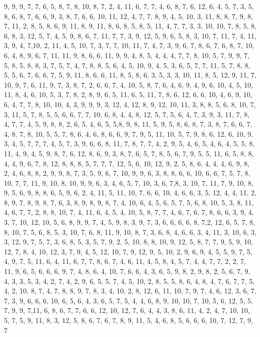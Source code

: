 \documentclass[fleqn,a4paper,12pt]{article}
\begin{document}
  9, 9, 9, 7, 7, 6, 5, 8, 7, 8, 10, 8, 7, 2, 4, 11, 6, 7, 7, 4, 6, 8, 7, 6, 12, 6, 4, 5, 7, 3, 5, 8, 6, 8, 7, 6, 6, 9, 3, 8, 7, 6, 6, 10, 11, 12, 4, 7, 7, 8, 9, 4, 5, 10, 3, 11, 8, 8, 7, 9, 8, 7, 11, 2, 8, 5, 8, 6, 9, 11, 8, 9, 11, 8, 6, 8, 5, 8, 5, 11, 4, 7, 7, 3, 3, 10, 10, 7, 8, 5, 8, 6, 8, 3, 12, 5, 7, 4, 5, 9, 8, 6, 7, 11, 7, 7, 3, 9, 12, 5, 9, 6, 5, 8, 3, 10, 7, 11, 7, 4, 11, 3, 9, 4, 7,10, 2, 11, 4, 5, 10, 7, 3, 7, 7, 10, 11, 7, 4, 7, 3, 9, 6, 7, 8, 6, 7, 6, 8, 7, 10, 6, 4, 8, 9, 6, 7, 11, 11, 9, 8, 6, 6, 11, 9, 9, 4, 8, 5, 4, 4, 4, 7, 7, 8, 10, 5, 7, 9, 9, 7, 5, 8, 5, 8, 8, 3, 7, 5, 7, 4, 7, 8, 8, 5, 6, 4, 5, 10, 9, 4, 5, 3, 6, 5, 7, 7, 11, 5, 7, 8, 8, 5, 5, 6, 7, 6, 6, 7, 5, 9, 11, 8, 6, 6, 11, 8, 5, 8, 6, 3, 5, 3, 3, 10, 11, 8, 5, 12, 9, 11, 7, 10, 9, 7, 6, 11, 9, 7, 3, 8, 7, 2, 6, 6, 7, 4, 10, 5, 8, 7, 6, 4, 6, 9, 4, 9, 6, 10, 4, 5, 10, 11, 8, 4, 6, 10, 5, 3, 7, 8, 2, 8, 9, 6, 5, 11, 6, 5, 11, 7, 8, 6, 12, 6, 6, 10, 4, 6, 9, 10, 6, 4, 7, 7, 8, 10, 10, 4, 3, 9, 9, 9, 3, 12, 4, 12, 8, 9, 12, 10, 11, 3, 8, 8, 5, 6, 8, 10, 7, 3, 11, 5, 7, 8, 5, 5, 6, 6, 7, 7, 10, 6, 8, 4, 4, 8, 12, 5, 7, 5, 6, 4, 7, 3, 9, 3, 11, 7, 8, 4, 7, 7, 4, 5, 9, 8, 8, 2, 6, 5, 4, 6, 5, 5,8, 9, 8, 11, 5, 9, 5, 8, 6, 8, 7, 3, 8, 7, 6, 6, 7, 4, 8, 7, 8, 10, 5, 5, 7, 8, 6, 4, 6, 8, 6, 6, 9, 7, 9, 5, 11, 10, 5, 7, 9, 8, 6, 12, 6, 10, 9, 3, 4, 5, 7, 7, 7, 4, 5, 7, 3, 9, 6, 6, 8, 11, 7, 8, 7, 7, 4, 2, 9, 5, 4, 6, 5, 4, 6, 4, 5, 5, 8, 11, 4, 9, 4, 5, 9, 8, 7, 6, 12, 8, 6, 9, 3, 8, 7, 6, 5, 7, 8, 5, 6, 7, 9, 5, 5, 11, 6, 5, 8, 8, 4, 4, 9, 6, 7, 8, 12, 8, 8, 8, 5, 7, 7, 7, 12, 5, 6, 10, 12, 9, 2, 5, 8, 6, 4, 4, 4, 6, 9, 8, 2, 4, 6, 8, 8, 2, 9, 9, 8, 7, 3, 5, 9, 6, 7, 10, 9, 9, 6, 3, 8, 8, 6, 6, 10, 6, 6, 7, 5, 7, 8, 10, 7, 7, 11, 9, 10, 8, 10, 9, 9, 6, 3, 4, 6, 5, 7, 10, 3, 6, 7,8, 3, 10, 7, 11, 7, 9, 10, 8, 9, 5, 6, 9, 8, 8, 6, 5, 9, 6, 2, 4, 11, 5, 11, 10, 7, 6, 6, 10, 4, 6, 6, 3, 5, 12, 4, 4, 11, 2, 8, 9, 7, 8, 9, 8, 7, 6, 3, 8, 9, 8, 9, 8, 7, 4, 10, 6, 4, 5, 6, 5, 7, 5, 6, 8, 10, 5, 3, 8, 11, 4, 6, 7, 7, 2, 8, 8, 10, 7, 4, 11, 6, 4, 5, 4, 10, 5, 8, 7, 7, 4, 6, 7, 6, 7, 8, 6, 6, 3, 9, 4, 3, 7, 10, 12, 10, 5, 6, 8, 9, 9, 7, 4, 5, 9, 8, 3, 9, 7, 3, 6, 6, 6, 6, 8, 7,2, 12, 6, 5, 7, 8, 8, 10, 7, 5, 6, 8, 5, 3, 10, 7, 6, 8, 11, 9, 10, 8, 7, 3, 6, 8, 4, 6, 6, 3, 4, 11, 3, 10, 6, 3, 3, 12, 9, 7, 5, 7, 3, 6, 8, 5, 3, 5, 7, 9, 2, 5, 10, 8, 8, 10, 9, 12, 5, 8, 7, 7, 9, 5, 9, 10, 12, 7, 8, 4, 10, 12, 3, 7, 9, 4, 5, 12, 10, 7, 9, 12, 9, 5, 10, 2, 9, 6, 9, 4, 5, 5, 9, 7, 5, 4, 9, 7, 5, 11, 6, 4, 11, 6, 7, 7, 8, 6, 7, 4, 6, 11, 4, 5, 8, 4, 5, 7, 4, 4, 7, 7, 2, 2, 7, 11, 9, 6, 5, 6, 6, 6, 9, 7, 4, 8, 6, 4, 10, 7, 6, 6, 4, 3, 6, 5, 9, 8, 2, 9, 8, 2, 5, 6, 7, 9, 4, 3, 3, 5, 3, 4, 2, 7, 4, 2, 9, 6, 5, 5, 7, 4, 5, 10, 2, 8, 5, 5, 8, 6, 4, 8, 4, 7, 6, 7, 7, 5, 4, 2, 10, 8, 7, 4, 7, 8, 8, 9, 7, 8, 3, 4, 10, 2, 8, 12, 6, 11, 10, 7, 9, 7, 4, 6, 12, 3, 6, 7, 7, 3, 9, 6, 6, 6, 10, 6, 5, 6, 4, 3, 6, 5, 7, 5, 4, 4, 6, 8, 9, 10, 10, 7, 10, 5, 6, 12, 5, 5, 7, 9, 9, 7,11, 6, 8, 6, 7, 7, 6, 6, 12, 10, 12, 7, 6, 4, 4, 3, 8, 6, 11, 4, 2, 4, 7, 10, 10, 5, 7, 5, 9, 11, 8, 3, 12, 5, 8, 6, 7, 6, 7, 8, 9, 11, 5, 4, 6, 8, 5, 6, 6, 6, 10, 7, 12, 7, 9, 7 \newline
\end{document}
